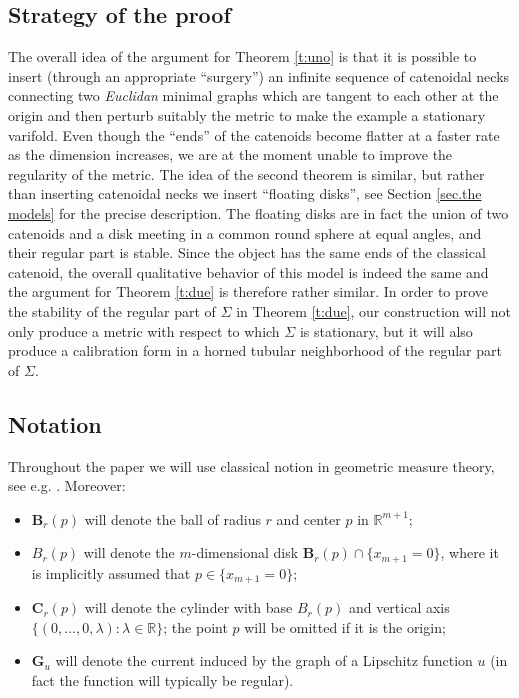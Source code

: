 \documentclass[reqno]{amsart}
\theoremstyle{definition}
\theoremstyle{remark}
\numberwithin{equation}{section}
\newcommand{\R}{\mathbb{R}}
\begin{document}
\subsection{Strategy of the proof} The overall idea of the argument for Theorem \ref{t:uno} is that it is possible to insert (through an appropriate ``surgery'') an infinite sequence of catenoidal necks connecting two {\em Euclidan} minimal graphs which are tangent to each other at the origin and then perturb suitably the metric to make the example a stationary varifold. Even though the ``ends'' of the catenoids become flatter at a faster rate as the dimension increases, we are at the moment unable to improve the regularity of the metric. The idea of the second theorem is similar, but rather than inserting catenoidal necks we insert ``floating disks'', see Section \ref{sec.the models} for the precise description. The floating disks are in fact the union of two catenoids and a disk meeting in a common round sphere at equal angles, and their regular part is stable. Since the object has the same ends of the classical catenoid, the overall qualitative behavior of this model is indeed the same and the argument for Theorem \ref{t:due} is therefore rather similar. In order to prove the stability of the regular part of $\Sigma$ in Theorem \ref{t:due}, our construction will not only produce a metric with respect to which $\Sigma$ is stationary, but it will also produce a calibration form in a horned tubular neighborhood of the regular part of $\Sigma$.


 \subsection{Notation} Throughout the paper we will use classical notion in geometric measure theory, see e.g. \cite{Simon}. Moreover:
\begin{itemize}
\item $\mathbf{B}_r (p)$ will denote the ball of radius $r$ and center $p$ in $\R^{m+1}$;
\item $B_r (p)$ will denote the $m$-dimensional disk $\mathbf{B}_r (p) \cap \{x_{m+1}=0\}$, where it is implicitly assumed that $p\in \{x_{m+1}=0\}$;
\item $\mathbf{C}_r (p)$ will denote the cylinder with base $B_r (p)$ and vertical axis $\{(0, ..., 0, \lambda) : \lambda \in \mathbb R\}$; the point $p$ will be omitted if it is the origin;
\item $\mathbf{G}_u$ will denote the current induced by the graph of a Lipschitz function $u$ (in fact the function will typically be regular).
\end{itemize}
\end{document}
